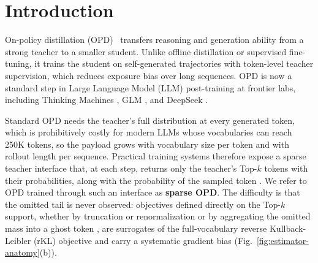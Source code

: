 \section{Introduction}

On-policy distillation (OPD)~\citep{agarwal2024policy,gu2024minillm} transfers reasoning and generation ability from a strong teacher to a smaller student. Unlike offline distillation \citep{kim-rush-2016-sequence} or supervised fine-tuning, it trains the student on self-generated trajectories with token-level teacher supervision, which reduces exposure bias over long sequences. OPD is now a standard step in Large Language Model (LLM) post-training at frontier labs, including Thinking Machines \citep{lu2025onpolicydistillation}, GLM \citep{zeng2026glm}, and DeepSeek \citep{xu2026deepseek}.

Standard OPD \citep{agarwal2024policy} needs the teacher's full distribution at every generated token,
which is prohibitively costly for modern LLMs whose vocabularies can reach 250K tokens,
so the payload grows with vocabulary size per token and with rollout length per sequence. Practical training systems therefore expose a sparse teacher interface that, at each step, returns only the teacher's Top-$k$ tokens with their probabilities, along with the probability of the sampled token \citep{zhang2026ema,huang2026tail}. We refer to OPD trained through such an interface as \textbf{sparse OPD}. The difficulty is that the omitted tail is never observed: objectives defined directly on the Top-$k$ support, whether by truncation or renormalization \citep{zhu2026many} or by aggregating the omitted mass into a ghost token \citep{anshumann-etal-2025-sparse,huang2026tail}, are surrogates of the full-vocabulary reverse Kullback-Leibler (rKL) objective and carry a systematic gradient bias (Fig.~\ref{fig:estimator-anatomy}(b)).

